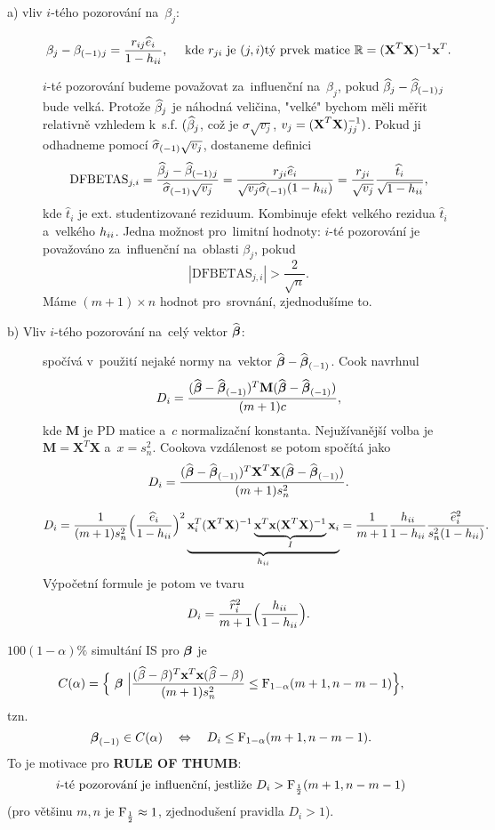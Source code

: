 \begin{description}
	\item[a) vliv $i$-tého pozorování na~$\beta_j$:]
	$$\beta_j-{\beta_{(-1)}}{}_j=\frac{r_{ij}\widehat{e}_i}{1-h_{ii}},\quad\text{ kde }r_{ji}\text{ je }(j,i)\text{tý prvek matice }\mathbb{R}=(\textbf{X}^T\textbf{X})^{-1}\textbf{x}^T.$$
	
	$i$-té pozorování budeme považovat za~influenční na~$\beta_j$, pokud $\widehat{\beta}_j-{\widehat{\beta}_{(-1)}}{}_j$ bude velká. Protože $\widehat{\beta} _j$ je náhodná veličina, "velké" bychom měli měřit relativně vzhledem k~s.f. $(\widehat{\beta} _j$, což je $\sigma\sqrt{v_j}$, $v_j=(\textbf{X}^T\textbf{X})^{-1} _{jj})$. Pokud ji odhadneme pomocí ${\widehat{{\sigma}}_{(-1)}}\sqrt{v_j}$, dostaneme definici
	$$ \mathrm{DFBETAS}_{j,i}=\frac{\widehat{\beta}_j-{\widehat{\beta}_{(-1)}}{}_j}{{\widehat{{\sigma}}_{(-1)}}\sqrt{v_j}}=\frac{r_{ji}\widehat{e}_i}{\sqrt{v_j}{\widehat{{\sigma}}_{(-1)}}(1-h_{ii})}=\frac{r_{ji}}{\sqrt{v_j}}\frac{\widehat{t}_i}{\sqrt{1-h_{ii}}},$$
	kde $\widehat{t}_i$ je ext. studentizované reziduum. Kombinuje efekt velkého rezidua $\widehat{t}_i$ a~velkého $h_{ii}$. Jedna možnost pro~limitní hodnoty: $i$-té pozorování je považováno za~influenční na~oblasti $\beta_j$, pokud 
	$$ |\mathrm{DFBETAS}_{j,i}|>\frac{2}{\sqrt{n}}.$$ Máme $(m+1)\times n$ hodnot pro~srovnání, zjednodušíme to.
	\item[b) Vliv $i$-tého pozorování na~celý vektor $\widehat{\boldsymbol{\beta}}$:] 
	spočívá v~použití nejaké normy na~vektor $\widehat{\boldsymbol{\beta}}-{\widehat{\boldsymbol{\beta}}_{(-1)}}$. Cook navrhnul
	$$ D_i=\frac{(\widehat{\boldsymbol{\beta}}-{\widehat{\boldsymbol{\beta}}_{(-1)}})^T\textbf{M}(\widehat{\boldsymbol{\beta}}-{\widehat{\boldsymbol{\beta}}_{(-1)}})}{(m+1)c},$$
	kde $\textbf{M}$ je PD matice a~$c$ normalizační konstanta. Nejužívanější volba je $\textbf{M}=\textbf{X}^T\textbf{X}$ a~$x=s_n^2$. Cookova vzdálenost se potom spočítá jako 
	$$ D_i=\frac{(\widehat{\boldsymbol{\beta}}-{\widehat{\boldsymbol{\beta}}_{(-1)}})^T\textbf{X}^T\textbf{X}(\widehat{\boldsymbol{\beta}}-{\widehat{\boldsymbol{\beta}}_{(-1)}})}{(m+1)s_n^2}.$$
	
	$$ D_i=\frac{1}{(m+1)s_n^2}\Big(\frac{\widehat{e}_i}{1-h_{ii}}\Big)^2 \underbrace{\textbf{x}_i^T(\textbf{X}^T\textbf{X})^{-1} \underbrace{\textbf{x}^T\textbf{x}(\textbf{X}^T\textbf{X})^{-1}}_{I}\textbf{x}_i}_{h_{ii}}=\frac{1}{m+1}\frac{h_{ii}}{1-h_{ii}}\frac{\widehat{e}_i^2}{s_n^2(1-h_{ii})}.$$
	Výpočetní formule je potom ve tvaru
	$$ D_i=\frac{\widehat{r}_i^2}{m+1}\Big(\frac{h_{ii}}{1-h_{ii}}\Big).$$
\end{description}

\begin{remark}
	$100(1-\alpha)\%$ simultání IS pro $\boldsymbol{\beta}$ je $$ C(\alpha)=\Big\{ ~\boldsymbol{\beta}~\Big|\frac{(\widehat{\beta}-\beta)^T\textbf{x}^T\textbf{x}(\widehat{\beta}-\beta)}{(m+1)s_n^2}\leq \mathrm{F}_{1-\alpha}(m+1,n-m-1) \Big\},$$
	tzn. $${\boldsymbol{\beta}_{(-1)}}\in C(\alpha)\quad \Leftrightarrow\quad D_i\leq \mathrm{F}_{1-\alpha}(m+1,n-m-1).$$
	To je motivace pro \textbf{RULE OF THUMB}: $$\text{$i$-té pozorování je influenční, jestliže $D_i>\mathrm{F}_{\frac{1}{2}}(m+1,n-m-1)$}$$ (pro většinu $m,n$ je $\mathrm{F}_{\frac{1}{2}}\approx1$, zjednodušení pravidla $D_i>1$).
\end{remark}

